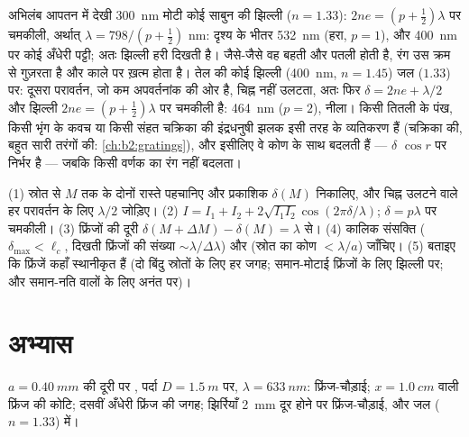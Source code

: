 \begin{example}[साबुन, तेल, व्याध-पतंग]\label{ex:b2:two-wave-interference:colours}
अभिलंब आपतन में देखी \qty{300}{nm} मोटी कोई साबुन की झिल्ली ($n = 1.33$):
$2ne = (p + \tfrac12)\lambda$ पर चमकीली, अर्थात् $\lambda = 798/(p + \tfrac12)$ nm: दृश्य के भीतर \qty{532}{nm}
(हरा, $p = 1$), और \qty{400}{nm} पर कोई अँधेरी पट्टी; अतः
झिल्ली हरी दिखती है। जैसे-जैसे वह बहती और पतली होती है, रंग उस
क्रम से गुज़रता है और काले पर ख़त्म होता है। तेल की कोई झिल्ली
(\qty{400}{nm}, $n = 1.45$) जल ($1.33$) पर: दूसरा परावर्तन, जो कम अपवर्तनांक की ओर है,
चिह्न नहीं उलटता, अतः फिर $\delta = 2ne + \lambda/2$ और झिल्ली $2ne =
(p + \tfrac12)\lambda$ पर चमकीली है: \qty{464}{nm} ($p = 2$), नीला। किसी
तितली के पंख, किसी भृंग के कवच या किसी संहत चक्रिका की इंद्रधनुषी झलक इसी तरह के
व्यतिकरण हैं (चक्रिका की, बहुत सारी तरंगों की: \cref{ch:b2:gratings}),
और इसीलिए वे कोण के साथ बदलती हैं --- $\delta$ $\cos r$ पर निर्भर है ---
जबकि किसी वर्णक का रंग नहीं बदलता।
\end{example}

\begin{method}\label{met:b2:two-wave-interference:method}
(1) स्रोत से $M$ तक के दोनों रास्ते पहचानिए और प्रकाशिक
 $\delta(M)$ निकालिए, और चिह्न उलटने वाले हर परावर्तन के लिए $\lambda/2$
जोड़िए। (2) $I = I_1 + I_2 + 2\sqrt{I_1I_2}\cos(2\pi\delta/\lambda)$;
$\delta = p\lambda$ पर चमकीली। (3) फ्रिंजों की दूरी $\delta(M + \Delta M) - \delta(M) =
\lambda$ से। (4) कालिक संसक्ति ($\delta_{\max} < \ell_c$, दिखती फ्रिंजों की संख्या
$\sim\lambda/\Delta\lambda$) और  (स्रोत का कोण
$< \lambda/a$) जाँचिए। (5) बताइए कि फ्रिंजें कहाँ स्थानीकृत हैं (दो बिंदु
स्रोतों के लिए हर जगह; समान-मोटाई फ्रिंजों के लिए झिल्ली पर; और समान-नति
वालों के लिए अनंत पर)।
\end{method}

\section{अभ्यास}

\begin{exercise}[$\star$]\label{exo:b2:two-wave-interference:1}
$a = \qty{0.40}{mm}$ की दूरी पर , पर्दा $D = \qty{1.5}{m}$ पर, $\lambda =
\qty{633}{nm}$: फ्रिंज-चौड़ाई; $x = \qty{1.0}{cm}$ वाली फ्रिंज की कोटि; दसवीं अँधेरी
फ्रिंज की जगह; झिर्रियाँ \qty{2}{mm} दूर होने पर फ्रिंज-चौड़ाई,
और जल ($n = 1.33$) में।
\end{exercise}

